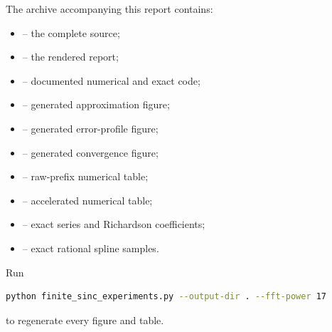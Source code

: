 \documentclass[11pt,oneside]{article}
\numberwithin{equation}{section}
\theoremstyle{definition}
\theoremstyle{remark}
\begin{document}
The archive accompanying this report contains:
\begin{itemize}[leftmargin=2em]
\item {} -- the complete source;
\item {} -- the rendered report;
\item {} -- documented numerical and exact code;
\item {} -- generated approximation figure;
\item {} -- generated error-profile figure;
\item {} -- generated convergence figure;
\item {} -- raw-prefix numerical table;
\item {} -- accelerated numerical table;
\item {} -- exact series and Richardson coefficients;
\item {} -- exact rational spline samples.
\end{itemize}
Run
\begin{lstlisting}[style=reportcode,language=bash]
python finite_sinc_experiments.py --output-dir . --fft-power 17
\end{lstlisting}
to regenerate every figure and table.
\end{document}
